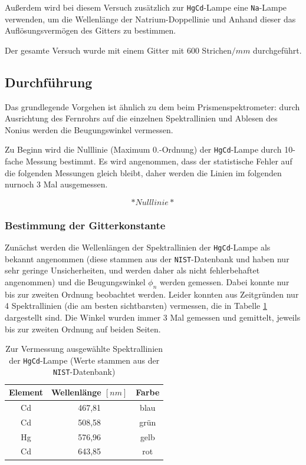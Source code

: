 \documentclass[a4paper, 11pt]{article}
\begin{document}
Außerdem wird bei diesem Versuch zusätzlich zur \texttt{HgCd}-Lampe eine \texttt{Na}-Lampe verwenden, um die Wellenlänge der Natrium-Doppellinie und Anhand dieser das Auflösungsvermögen des Gitters zu bestimmen.

Der gesamte Versuch wurde mit einem Gitter mit 600 Strichen$/mm$ durchgeführt.


\subsection{Durchführung}
Das grundlegende Vorgehen ist ähnlich zu dem beim Prismenspektrometer: durch Ausrichtung des Fernrohrs auf die einzelnen Spektrallinien und Ablesen des Nonius werden die Beugungswinkel vermessen.

Zu Beginn wird die Nulllinie (Maximum 0.-Ordnung) der \texttt{HgCd}-Lampe durch 10-fache Messung bestimmt. Es wird angenommen, dass der statistische Fehler auf die folgenden Messungen gleich bleibt, daher werden die Linien im folgenden nurnoch 3 Mal ausgemessen.

\begin{equation}
*Nulllinie*	
\end{equation}

\subsubsection{Bestimmung der Gitterkonstante}
Zunächst werden die Wellenlängen der Spektrallinien der \texttt{HgCd}-Lampe als bekannt angenommen (diese stammen aus der \texttt{NIST}-Datenbank und haben nur sehr geringe Unsicherheiten, und werden daher als nicht fehlerbehaftet angenommen) und die Beugungswinkel $\phi_n$ werden gemessen. Dabei konnte nur bis zur zweiten Ordnung beobachtet werden. Leider konnten aus Zeitgründen nur 4 Spektrallinien (die am besten sichtbarsten) vermessen, die in Tabelle \ref{table:SpektrumHgCd} dargestellt sind. Die Winkel wurden immer 3 Mal gemessen und gemittelt, jeweils bis zur zweiten Ordnung auf beiden Seiten.

\begin{table}[H]
\large
\centering
	\begin{tabular}{|c|c|c|}
	\hline
	Element & Wellenlänge $[nm]$ & Farbe \\
	\hline
	Cd & 467,81 & blau \\
	\hline
	Cd & 508,58 & grün \\
	\hline
	Hg & 576,96 & gelb \\
	\hline
	Cd & 643,85 & rot \\
	\hline
	\end{tabular}
\caption{Zur Vermessung ausgewählte Spektrallinien der \texttt{HgCd}-Lampe (Werte stammen aus der \texttt{NIST}-Datenbank)}
\label{table:SpektrumHgCd}
\end{table}
\end{document}

